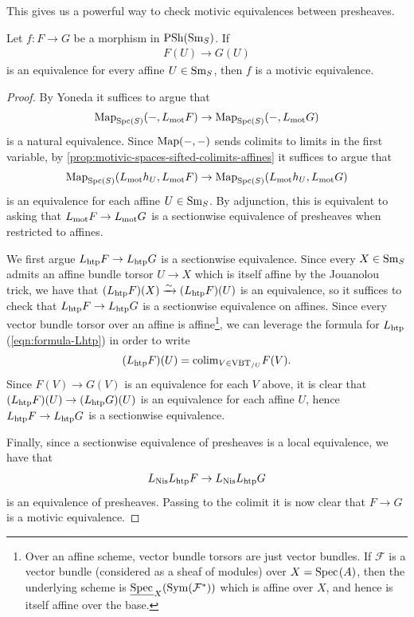 \documentclass[11pt,openany]{book}
\begin{document}
This gives us a powerful way to check motivic equivalences between presheaves.



\begin{proposition} \cite[3.16]{Hoyois6} Let $f \colon F \to G$ be a morphism in $\mathrm{PSh}(\mathrm{Sm}_S)$. If
\begin{align*}
    F(U) \to G(U)
\end{align*}
is an equivalence for every affine $U\in \mathrm{Sm}_S$, then $f$ is a motivic equivalence.
\end{proposition}
\begin{proof} 


By Yoneda it suffices to argue that
\begin{align*}
    \mathrm{Map}_{\mathrm{Spc}(S)} (-,L_{\mathrm{mot}} F) \to \mathrm{Map}_{\mathrm{Spc}(S)} (-,L_{\mathrm{mot}} G)
\end{align*}
is a natural equivalence. Since $\mathrm{Map}(-,-)$ sends colimits to limits in the first variable, by \autoref{prop:motivic-spaces-sifted-colimits-affines} it suffices to argue that
\begin{align*}
    \mathrm{Map}_{\mathrm{Spc}(S)}(L_{\mathrm{mot}} h_U, L_{\mathrm{mot}} F) \to \mathrm{Map}_{\mathrm{Spc}(S)}(L_{\mathrm{mot}} h_U, L_{\mathrm{mot}} G)
\end{align*}
is an equivalence for each affine $U \in \mathrm{Sm}_S$. By adjunction, this is equivalent to asking that $L_{\mathrm{mot}} F \to L_{\mathrm{mot}} G$ is a sectionwise equivalence of presheaves when restricted to affines.

We first argue $L_{\mathrm{htp}} F \to L_{\mathrm{htp}} G$ is a sectionwise equivalence. Since every $X\in \mathrm{Sm}_S$ admits an affine bundle torsor $U \to X$ which is itself affine by the Jouanolou trick, we have that $(L_{\mathrm{htp}}F)(X) \xrightarrow{\sim} (L_{\mathrm{htp}} F)(U)$ is an equivalence, so it suffices to check that $L_{\mathrm{htp}} F \to L_{\mathrm{htp}} G$ is a sectionwise equivalence on affines. Since every vector bundle torsor over an affine is affine\footnote{%
Over an affine scheme, vector bundle torsors are just vector bundles. If $\mathscr{F}$ is a vector bundle (considered as a sheaf of modules) over $X = \text{Spec}\hspace{0.1em}(A)$, then the underlying scheme is $\underline{\text{Spec}\hspace{0.1em}}_X(\mathrm{Sym}(\mathcal{F}^\ast))$ which is affine over $X$, and hence is itself affine over the base.
}, we can leverage the formula for $L_{\mathrm{htp}}$ (\autoref{eqn:formula-Lhtp}) in order to write
\begin{align*}
    (L_{\mathrm{htp}} F)(U) = \mathrm{colim}_{V\in \text{VBT}_{/U}} F(V).
\end{align*}
Since $F(V) \to G(V)$ is an equivalence for each $V$ above, it is clear that $(L_{\mathrm{htp}} F)(U) \to (L_{\mathrm{htp}} G)(U)$ is an equivalence for each affine $U$, hence $L_{\mathrm{htp}} F \to L_{\mathrm{htp}} G$ is a sectionwise equivalence.

Finally, since a sectionwise equivalence of presheaves is a local equivalence, we have that
\begin{align*}
    L_{\mathrm{Nis}} L_{\mathrm{htp}} F \to L_{\mathrm{Nis}} L_{\mathrm{htp}} G
\end{align*}
is an equivalence of presheaves. Passing to the colimit it is now clear that $F \to G$ is a motivic equivalence.
\end{proof}
\end{document}
